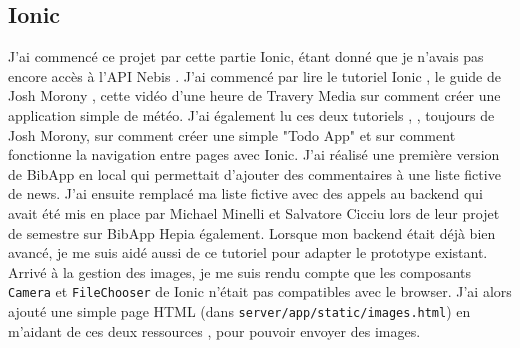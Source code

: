 \documentclass[a4paper, 12pt]{article}
\begin{document}
\subsection{Ionic}
J'ai commencé ce projet par cette partie Ionic, étant donné que je n'avais pas encore accès à l'API Nebis \cite{ref80}.
J'ai commencé par lire le tutoriel Ionic \cite{ref0}, le guide de Josh Morony \cite{ref10}, cette vidéo d'une heure
de Travery Media \cite{ref18} sur comment créer une application simple de météo. J'ai également lu ces deux tutoriels
\cite{ref40}, \cite{ref50}, toujours de Josh Morony, sur comment créer une simple "Todo App" et sur comment fonctionne
la navigation entre pages avec Ionic. J'ai réalisé une première version de BibApp en local qui permettait d'ajouter
des commentaires à une liste fictive de news. J'ai ensuite remplacé ma liste fictive avec des appels au backend qui
avait été mis en place par Michael Minelli et Salvatore Cicciu lors de leur projet de semestre sur BibApp Hepia
également. Lorsque mon backend était déjà bien avancé, je me suis aidé aussi de ce tutoriel \cite{ref90} pour adapter
le prototype existant. Arrivé à la gestion des images, je me suis rendu compte que les composants \texttt{Camera}
et \texttt{FileChooser} de Ionic n'était pas compatibles avec le browser. J'ai alors ajouté une simple page
HTML (dans \texttt{server/app/static/images.html}) en m'aidant de ces deux ressources \cite{ref140}, \cite{ref150}
pour pouvoir envoyer des images.
\end{document}
